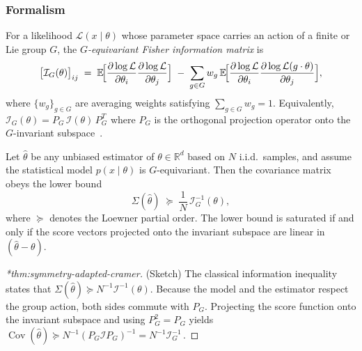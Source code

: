             \subsubsection{Formalism}
            \begin{definition}
                For a likelihood \(\mathcal L(x\mid\theta)\) whose parameter space carries an action of a finite or Lie group \(G\), the \emph{\(G\)-equivariant Fisher information matrix} is  
                \[
                  \bigl[\mathcal I_G(\theta)\bigr]_{ij}
                  \;=\;
                  \mathbb E\!\Bigl[
                      \frac{\partial\log \mathcal L}{\partial\theta_i}
                      \frac{\partial\log \mathcal L}{\partial\theta_j}
                  \Bigr]
                  \;-\;
                  \sum_{g\in G} w_g\,
                  \mathbb E\!\Bigl[
                      \frac{\partial\log \mathcal L}{\partial\theta_i}
                      \frac{\partial\log \mathcal L(g \cdot \theta)}{\partial\theta_j}
                  \Bigr],
                \]
                where \(\{w_g\}_{g\in G}\) are averaging weights satisfying \(\sum_{g\in G}w_g=1\).  Equivalently,  
                \(\mathcal I_G(\theta)=P_G\,\mathcal I(\theta)\,P_G^{T}\) where \(P_G\) is the orthogonal projection operator onto the \(G\)-invariant subspace~\cite{nielsen_elementary_2020}.
\end{definition}
\begin{theorem}
\label{thm:symmetry-adapted-cramer}
    Let \(\hat\theta\) be any unbiased estimator of \(\theta\in\mathbb R^d\) based on \(N\) i.i.d.\ samples, and assume the statistical model \(p(x\mid\theta)\) is \(G\)-equivariant.
Then the covariance matrix obeys the lower bound
\[
  \Sigma(\hat\theta)
  \;\succeq\;
  \frac{1}{N}\,\mathcal I_G^{-1}(\theta),
\]
where \(\succeq\) denotes the Loewner partial order.  The lower bound is saturated if and only if the score vectors projected onto the invariant subspace are linear in \((\hat\theta-\theta)\).
\end{theorem}

\begin{proof}[*thm:symmetry-adapted-cramer]
(Sketch) The classical information inequality states that
\(\Sigma(\hat\theta)\succeq N^{-1}\mathcal I^{-1}(\theta)\).
Because the model and the estimator respect the group action, both sides commute with \(P_G\).  
Projecting the score function onto the invariant subspace and using \(P_G^2=P_G\) yields  
\(\operatorname{Cov}(\hat\theta)\succeq N^{-1}(P_G\mathcal I P_G)^{-1}=N^{-1}\mathcal I_G^{-1}\,\).
\end{proof}

